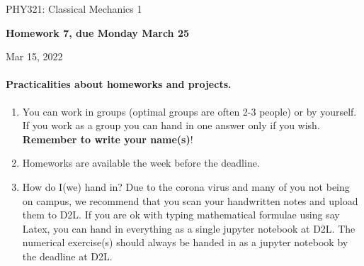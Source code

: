 \documentclass[%
oneside,                 %
final,                   %
10pt]{article}
\begin{document}

\newcommand{\exercisesection}[1]{\subsection*{#1}}






\thispagestyle{empty}

\begin{center}
{\LARGE\bf
\begin{spacing}{1.25}
PHY321: Classical Mechanics 1
\end{spacing}
}
\end{center}


\begin{center}
{\bf Homework 7, due Monday  March 25${}^{}$} \\ [0mm]
\end{center}

\begin{center}
\end{center}
    

\begin{center}
Mar 15, 2022
\end{center}

\vspace{1cm}


\paragraph{Practicalities about  homeworks and projects.}
\begin{enumerate}
\item You can work in groups (optimal groups are often 2-3 people) or by yourself. If you work as a group you can hand in one answer only if you wish. \textbf{Remember to write your name(s)}!

\item Homeworks are available  the week before the deadline. 

\item How do I(we)  hand in?  Due to the corona virus and many of you not being on campus, we recommend that you scan your handwritten notes and upload them to D2L. If you are ok with typing mathematical formulae using say Latex, you can hand in everything as a single jupyter notebook at D2L. The numerical exercise(s) should always be handed in as a jupyter notebook by the deadline at D2L. 
\end{enumerate}
\end{document}
